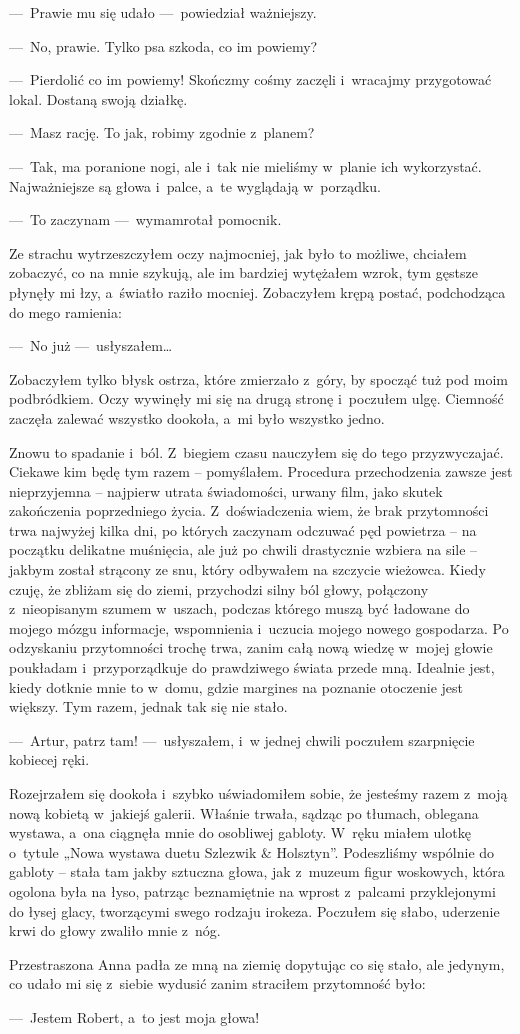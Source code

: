 ---~Prawie mu się udało ---~powiedział ważniejszy.

---~No, prawie. Tylko psa szkoda, co im powiemy?

---~Pierdolić co im powiemy! Skończmy cośmy zaczęli i~wracajmy przygotować lokal. Dostaną swoją działkę.

---~Masz rację. To jak, robimy zgodnie z~planem? 

---~Tak, ma poranione nogi, ale i~tak nie mieliśmy w~planie ich wykorzystać. Najważniejsze są głowa i~palce, a~te wyglądają w~porządku.

---~To zaczynam ---~wymamrotał pomocnik.

Ze strachu wytrzeszczyłem oczy najmocniej, jak było to możliwe, chciałem zobaczyć, co na mnie szykują, ale im bardziej wytężałem wzrok, tym gęstsze płynęły mi łzy, a~światło raziło mocniej. Zobaczyłem krępą postać, podchodząca do mego ramienia: 

---~No już ---~usłyszałem…

Zobaczyłem tylko błysk ostrza, które zmierzało z~góry, by spocząć tuż pod moim podbródkiem. Oczy wywinęły mi się na drugą stronę i~poczułem ulgę. Ciemność zaczęła zalewać wszystko dookoła, a~mi było wszystko jedno. 

\paraSep

Znowu to spadanie i~ból. Z~biegiem czasu nauczyłem się do tego przyzwyczajać. Ciekawe kim będę tym razem -- pomyślałem. Procedura przechodzenia zawsze jest nieprzyjemna -- najpierw utrata świadomości, urwany film, jako skutek zakończenia poprzedniego życia. Z~doświadczenia wiem, że brak przytomności trwa najwyżej kilka dni, po których zaczynam odczuwać pęd powietrza -- na początku delikatne muśnięcia, ale już po chwili drastycznie wzbiera na sile -- jakbym został strącony ze snu, który odbywałem na szczycie wieżowca. Kiedy czuję, że zbliżam się do ziemi, przychodzi silny ból głowy, połączony z~nieopisanym szumem w~uszach, podczas którego muszą być ładowane do mojego mózgu informacje, wspomnienia i~uczucia mojego nowego gospodarza. Po odzyskaniu przytomności trochę trwa, zanim całą nową wiedzę w~mojej głowie poukładam i~przyporządkuje do prawdziwego świata przede mną. Idealnie jest, kiedy dotknie mnie to w~domu, gdzie margines na poznanie otoczenie jest większy. Tym razem, jednak tak się nie stało. 

---~Artur, patrz tam! ---~usłyszałem, i~w jednej chwili poczułem szarpnięcie kobiecej ręki.
 
Rozejrzałem się dookoła i~szybko uświadomiłem sobie, że jesteśmy razem z~moją nową kobietą w~jakiejś galerii. Właśnie trwała, sądząc po tłumach, oblegana wystawa, a~ona ciągnęła mnie do osobliwej gabloty. W~ręku miałem ulotkę o~tytule „Nowa wystawa duetu Szlezwik \& Holsztyn”. Podeszliśmy wspólnie do gabloty -- stała tam jakby sztuczna głowa, jak z~muzeum figur woskowych, która ogolona była na łyso, patrząc beznamiętnie na wprost z~palcami przyklejonymi do łysej glacy, tworzącymi swego rodzaju irokeza. Poczułem się słabo, uderzenie krwi do głowy zwaliło mnie z~nóg. 

Przestraszona Anna padła ze mną na ziemię dopytując co się stało, ale jedynym, co udało mi się z~siebie wydusić zanim straciłem przytomność było: 

---~Jestem Robert, a~to jest moja głowa!
